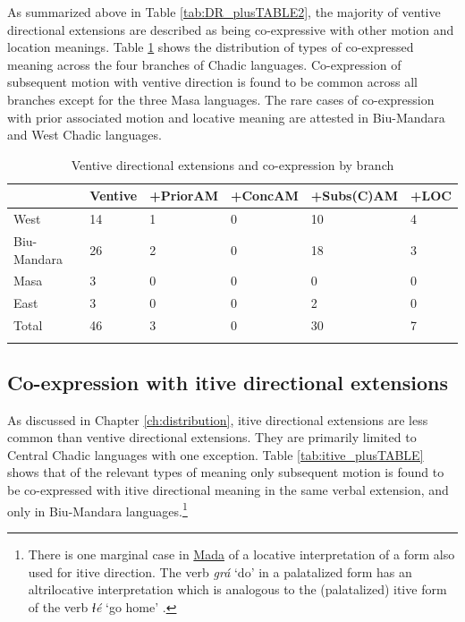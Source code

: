 As summarized above in Table \ref{tab:DR_plusTABLE2}, the majority of ventive directional extensions are described as being co-expressive with other motion and location meanings. Table \ref{tab:vent_plusTABLE} shows the distribution of types of co-expressed meaning across the four branches of Chadic languages. Co-expression of subsequent motion with ventive direction is found to be common across all branches except for the three Masa languages. The rare cases of co-expression with prior associated motion and locative meaning are attested in Biu-Mandara and West Chadic languages.

\begin{table}
	\caption{Ventive directional extensions and co-expression by branch}
	\label{tab:vent_plusTABLE}
	\begin{tabular}{llllll} %
		\lsptoprule
		{} &  Ventive &  +PriorAM &  +ConcAM &  +Subs(C)AM &  +LOC \\
		\midrule
		West &       14 &         1 &        0 &          10 &     4 \\
		Biu-Mandara &       26 &         2 &        0 &          18 &     3 \\
		Masa &        3 &         0 &        0 &           0 &     0 \\
		East &        3 &         0 &        0 &           2 &     0 \\
		Total &       46 &         3 &        0 &          30 &     7 \\
		\lspbottomrule
	\end{tabular}
\end{table}

\subsection{Co-expression with itive directional extensions} \label{sec:coitive2}

As discussed in Chapter \ref{ch:distribution}, itive directional extensions are less common than ventive directional extensions. They are primarily limited to Central Chadic languages with one exception. Table \ref{tab:itive_plusTABLE} shows that of the relevant types of meaning only subsequent motion is found to be co-expressed with itive directional meaning in the same verbal extension, and only in Biu-Mandara languages.\footnote{There is one marginal case in \hyperref[mada]{Mada} of a locative interpretation of a form also used for itive direction. The verb \textit{grá} `do' in a palatalized form has an altrilocative interpretation which is analogous to the (palatalized) itive form of the verb \textit{ɬé} `go home' \citep[29]{ernstkurdiTenseAspectMood2016}.}

